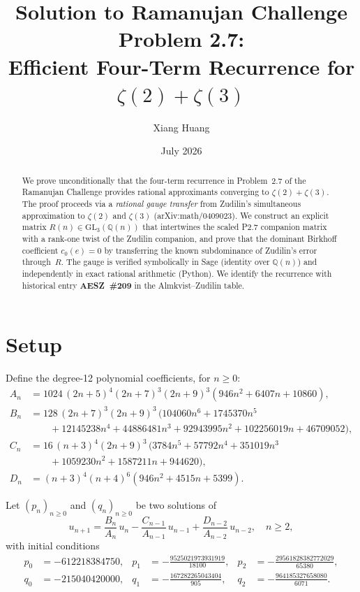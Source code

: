 \documentclass[11pt]{article}
\title{Solution to Ramanujan Challenge Problem 2.7:\\
Efficient Four-Term Recurrence for $\zeta(2) + \zeta(3)$}
\author{Xiang Huang}
\date{July 2026}
\theoremstyle{remark}
\begin{document}
\maketitle

\begin{abstract}
We prove unconditionally that the four-term recurrence in
Problem~2.7 of the Ramanujan Challenge provides rational
approximants converging to $\zeta(2) + \zeta(3)$.
The proof proceeds via a \emph{rational gauge transfer} from
Zudilin's simultaneous approximation to $\zeta(2)$ and $\zeta(3)$
(arXiv:math/0409023).
We construct an explicit matrix
$R(n) \in \mathrm{GL}_3(\mathbb{Q}(n))$
that intertwines the scaled P2.7 companion matrix with a
rank-one twist of the Zudilin companion, and prove that the
dominant Birkhoff coefficient $c_0(e) = 0$ by transferring the
known subdominance of Zudilin's error through~$R$.
The gauge is verified symbolically in Sage (identity over
$\mathbb{Q}(n)$) and independently in exact rational arithmetic
(Python).
We identify the recurrence with historical entry
\textbf{AESZ~\#209} in the Almkvist--Zudilin table.
\end{abstract}

\section{Setup}\label{sec:setup}

Define the degree-12 polynomial coefficients, for $n \ge 0$:
\begin{align*}
A_n &= 1024\,(2n{+}5)^4(2n{+}7)^3(2n{+}9)^3
(946n^2{+}6407n{+}10860), \\
B_n &= 128\,(2n{+}7)^3(2n{+}9)^3\,(104060n^6{+}1745370n^5 \\
&\qquad {+}12145238n^4{+}44886481n^3{+}92943995n^2
{+}102256019n{+}46709052), \\
C_n &= 16\,(n{+}3)^4(2n{+}9)^3\,(3784n^5{+}57792n^4
{+}351019n^3 \\
&\qquad {+}1059230n^2{+}1587211n{+}944620), \\
D_n &= (n{+}3)^4(n{+}4)^6(946n^2{+}4515n{+}5399).
\end{align*}

Let $(p_n)_{n\ge 0}$ and $(q_n)_{n\ge 0}$ be two solutions of
\begin{equation}\label{eq:rec}
u_{n+1} = \frac{B_n}{A_n}\,u_n
- \frac{C_{n-1}}{A_{n-1}}\,u_{n-1}
+ \frac{D_{n-2}}{A_{n-2}}\,u_{n-2},
\quad n \ge 2,
\end{equation}
with initial conditions
\begin{align*}
p_0 &= -612218384750, &
p_1 &= -\frac{9525021973931919}{18100}, &
p_2 &= -\frac{29561828382772029}{65380}, \\[4pt]
q_0 &= -215040420000, &
q_1 &= -\frac{167282265043404}{905}, &
q_2 &= -\frac{964185327658080}{6071}.
\end{align*}
\end{document}
